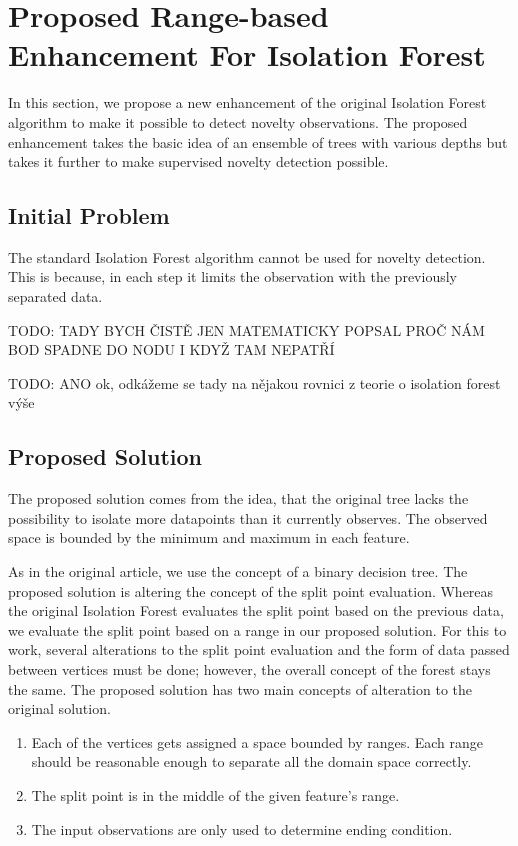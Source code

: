 \section{Proposed Range-based Enhancement For Isolation Forest}
\label{sec:novelty_isolation_forest}
In this section, we propose a new enhancement of the original Isolation Forest algorithm to make it possible to detect novelty observations.
The proposed enhancement takes the basic idea of an ensemble of trees with various depths but takes it further to make supervised novelty detection possible.

\subsection{Initial Problem}
 The standard Isolation Forest algorithm cannot be used for novelty detection. This is because, in each step it limits the observation with the previously separated data.


TODO: TADY BYCH ČISTĚ JEN MATEMATICKY POPSAL PROČ NÁM BOD SPADNE DO NODU I KDYŽ TAM NEPATŘÍ

TODO: ANO ok, odkážeme se tady na nějakou rovnici z teorie o isolation forest výše

\subsection{Proposed Solution}
The proposed solution comes from the idea, that the original tree lacks the possibility to isolate more datapoints than it currently observes.
The observed space is bounded by the minimum and maximum in each feature.

As in the original article, we use the concept of a binary decision tree. The proposed solution is altering the concept of the split point evaluation. Whereas the original Isolation Forest evaluates the split point based on the previous data, we
evaluate the split point based on a range in our proposed solution. For this to work, several alterations to the split point evaluation and the form of data passed between vertices must be done; however, the overall concept of the forest stays the same.
The proposed solution has two main concepts of alteration to the original solution.

\begin{enumerate}
    \item Each of the vertices gets assigned a space bounded by ranges. Each range should be reasonable enough to separate all the domain space correctly.
    \item The split point is in the middle of the given feature’s range.
    \item The input observations are only used to determine ending condition.
\end{enumerate}

